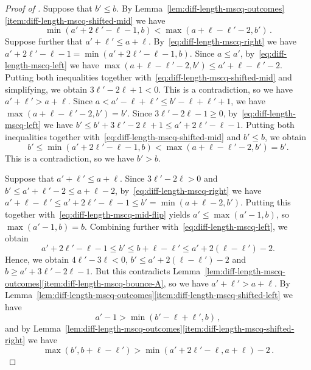 \documentclass[12pt]{article}
\theoremstyle{plain}
\theoremstyle{definition}
\begin{document}
\begin{proof}[Proof of ]
		Suppose that $b'\le b$. By Lemma~\ref{lem:diff-length-mscq-outcomes}\ref{item:diff-length-mscq-shifted-mid} we have 
		\begin{equation} \label{eq:diff-length-mscq-shifted-mid}
			\min(a'+2\ell'-\ell-1,b) < \max(a+\ell-\ell'-2,b')\,.
		\end{equation}
		Suppose further that $a'+\ell'\le a+\ell$. By~\eqref{eq:diff-length-mscq-right} we have $a'+2\ell'-\ell-1 = \min(a'+2\ell'-\ell-1,b)$. Since $a\le a'$, by~\eqref{eq:diff-length-mscq-left} we have $\max(a+\ell-\ell'-2,b')\le a'+\ell-\ell'-2$. Putting both inequalities together with~\eqref{eq:diff-length-mscq-shifted-mid} and simplifying, we obtain $3\ell'-2\ell+1<0$. This is a contradiction, so we have $a'+\ell'>a+\ell$. Since $a<a'-\ell+\ell'\le b'-\ell+\ell'+1$, we have $\max(a+\ell-\ell'-2,b')=b'$. Since $3\ell'-2\ell-1\ge0$, by~\eqref{eq:diff-length-mscq-left} we have $b'\le b'+3\ell'-2\ell+1\le a'+2\ell'-\ell-1$. Putting both inequalities together with~\eqref{eq:diff-length-mscq-shifted-mid} and $b'\le b$, we obtain
		\[ b' \le \min(a'+2\ell'-\ell-1,b) < \max(a+\ell-\ell'-2,b') = b'.\]
		This is a contradiction, so we have $b'>b$.
		
		Suppose that $a'+\ell'\le a+\ell$. Since $3\ell'-2\ell>0$ and $b'\le a'+\ell'-2\le a+\ell-2$, by~\eqref{eq:diff-length-mscq-right} we have $a'+\ell-\ell'\le a'+2\ell'-\ell-1\le b'=\min(a+\ell-2,b')$. Putting this together with~\eqref{eq:diff-length-mscq-mid-flip} yields $a'\le\max(a'-1,b)$, so $\max(a'-1,b)=b$. Combining further with~\eqref{eq:diff-length-mscq-left}, we obtain
		\[a'+2\ell'-\ell-1\le b'\le b+\ell-\ell'\le a'+2(\ell-\ell')-2.\]
		Hence, we obtain $4\ell'-3\ell<0$, $b'\le a'+2(\ell-\ell')-2$ and $b\ge a'+3\ell'-2\ell-1$. But this contradicts Lemma~\ref{lem:diff-length-mscq-outcomes}\ref{item:diff-length-mscq-bounce-A}, so we have $a'+\ell'>a+\ell$. By Lemma~\ref{lem:diff-length-mscq-outcomes}\ref{item:diff-length-mscq-shifted-left} we have
		\begin{equation} \label{eq:diff-length-mscq-shifted-left}
			a'-1 > \min(b'-\ell+\ell',b)\,,
		\end{equation}
		and by Lemma~\ref{lem:diff-length-mscq-outcomes}\ref{item:diff-length-mscq-shifted-right} we have
		\begin{equation} \label{eq:diff-length-mscq-shifted-right}
			\max(b',b+\ell-\ell') > \min(a'+2\ell'-\ell,a+\ell)-2\,.
		\end{equation}
		

\end{proof}
\end{document}
